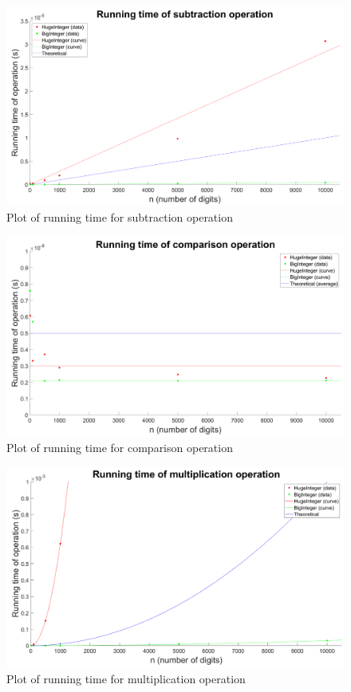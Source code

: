 \documentclass[12pt]{article}
\begin{document}
\begin{figure}[h!]
    \centering
    \includegraphics[width=\textwidth]{subtractionplot.png}
    \caption{Plot of running time for subtraction operation}
\end{figure}
\begin{figure}[h!]
    \centering
    \includegraphics[width=\textwidth]{comparisonplot.png}
    \caption{Plot of running time for comparison operation}
\end{figure}
\begin{figure}[h!]
    \centering
    \includegraphics[width=\textwidth]{multiplicationplot.png}
    \caption{Plot of running time for multiplication operation}
\end{figure}
\end{document}
